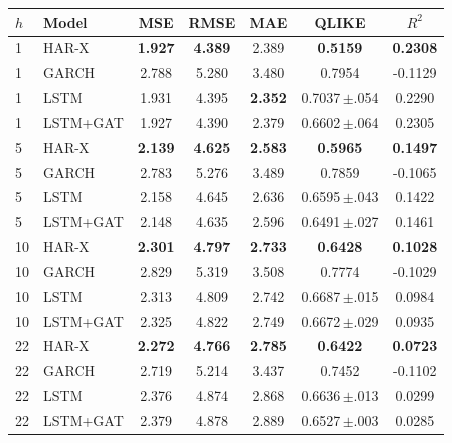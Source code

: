 \begin{tabular}{llccccc}
\toprule
$h$ & Model & MSE & RMSE & MAE & QLIKE & $R^2$ \\
\midrule
1 & HAR-X & \textbf{1.927} & \textbf{4.389} & 2.389 & \textbf{0.5159} & \textbf{0.2308} \\
1 & GARCH & 2.788 & 5.280 & 3.480 & 0.7954 & -0.1129 \\
1 & LSTM & 1.931 & 4.395 & \textbf{2.352} & 0.7037\,$\pm$.054 & 0.2290 \\
1 & LSTM+GAT & 1.927 & 4.390 & 2.379 & 0.6602\,$\pm$.064 & 0.2305 \\
\midrule
5 & HAR-X & \textbf{2.139} & \textbf{4.625} & \textbf{2.583} & \textbf{0.5965} & \textbf{0.1497} \\
5 & GARCH & 2.783 & 5.276 & 3.489 & 0.7859 & -0.1065 \\
5 & LSTM & 2.158 & 4.645 & 2.636 & 0.6595\,$\pm$.043 & 0.1422 \\
5 & LSTM+GAT & 2.148 & 4.635 & 2.596 & 0.6491\,$\pm$.027 & 0.1461 \\
\midrule
10 & HAR-X & \textbf{2.301} & \textbf{4.797} & \textbf{2.733} & \textbf{0.6428} & \textbf{0.1028} \\
10 & GARCH & 2.829 & 5.319 & 3.508 & 0.7774 & -0.1029 \\
10 & LSTM & 2.313 & 4.809 & 2.742 & 0.6687\,$\pm$.015 & 0.0984 \\
10 & LSTM+GAT & 2.325 & 4.822 & 2.749 & 0.6672\,$\pm$.029 & 0.0935 \\
\midrule
22 & HAR-X & \textbf{2.272} & \textbf{4.766} & \textbf{2.785} & \textbf{0.6422} & \textbf{0.0723} \\
22 & GARCH & 2.719 & 5.214 & 3.437 & 0.7452 & -0.1102 \\
22 & LSTM & 2.376 & 4.874 & 2.868 & 0.6636\,$\pm$.013 & 0.0299 \\
22 & LSTM+GAT & 2.379 & 4.878 & 2.889 & 0.6527\,$\pm$.003 & 0.0285 \\
\bottomrule
\end{tabular}
